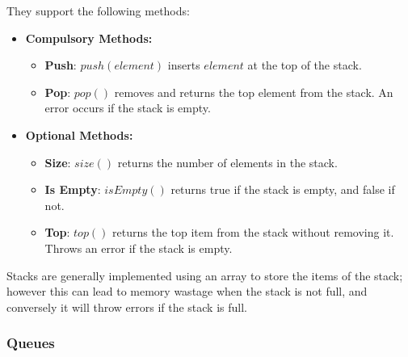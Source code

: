  They support the following methods:
\begin{itemize}
    \item \textbf{Compulsory Methods:}
    \begin{itemize}
        \item \textbf{Push}: \(push(element)\) inserts \(element\) at the top of the stack.
        \item \textbf{Pop}: \(pop()\) removes and returns the top element from the stack. An error occurs if the stack is empty.
    \end{itemize}
    \item \textbf{Optional Methods:}
    \begin{itemize}
        \item \textbf{Size}: \(size()\) returns the number of elements in the stack.
        \item \textbf{Is Empty}: \(isEmpty()\) returns true if the stack is empty, and false if not.
        \item \textbf{Top}: \(top()\) returns the top item from the stack without removing it. Throws an error if the stack is empty.
    \end{itemize}
\end{itemize}
Stacks are generally implemented using an array to store the items of the stack; however this can lead to memory wastage when the stack is not full, and conversely it will throw errors if the stack is full.

\newpage\subsubsection{Queues}

